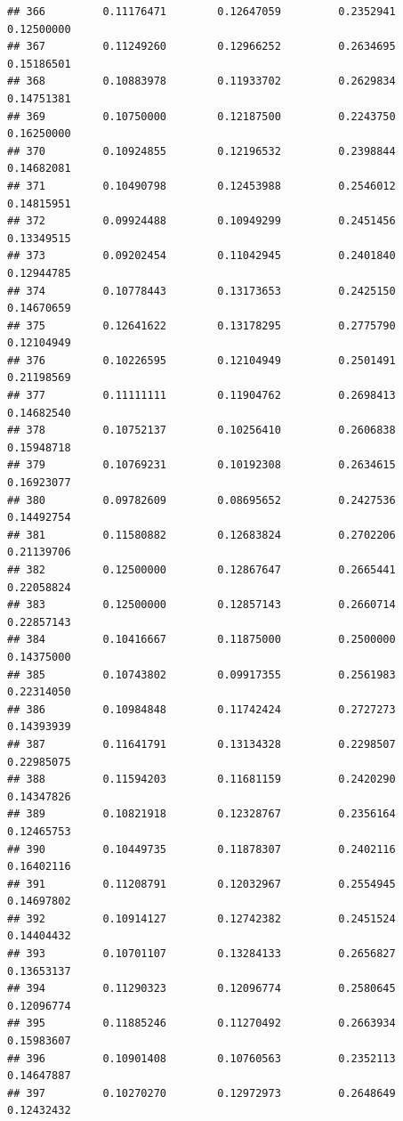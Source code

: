 \documentclass[]{article}
\begin{document}
\begin{verbatim}
## 366         0.11176471        0.12647059         0.2352941          0.12500000
## 367         0.11249260        0.12966252         0.2634695          0.15186501
## 368         0.10883978        0.11933702         0.2629834          0.14751381
## 369         0.10750000        0.12187500         0.2243750          0.16250000
## 370         0.10924855        0.12196532         0.2398844          0.14682081
## 371         0.10490798        0.12453988         0.2546012          0.14815951
## 372         0.09924488        0.10949299         0.2451456          0.13349515
## 373         0.09202454        0.11042945         0.2401840          0.12944785
## 374         0.10778443        0.13173653         0.2425150          0.14670659
## 375         0.12641622        0.13178295         0.2775790          0.12104949
## 376         0.10226595        0.12104949         0.2501491          0.21198569
## 377         0.11111111        0.11904762         0.2698413          0.14682540
## 378         0.10752137        0.10256410         0.2606838          0.15948718
## 379         0.10769231        0.10192308         0.2634615          0.16923077
## 380         0.09782609        0.08695652         0.2427536          0.14492754
## 381         0.11580882        0.12683824         0.2702206          0.21139706
## 382         0.12500000        0.12867647         0.2665441          0.22058824
## 383         0.12500000        0.12857143         0.2660714          0.22857143
## 384         0.10416667        0.11875000         0.2500000          0.14375000
## 385         0.10743802        0.09917355         0.2561983          0.22314050
## 386         0.10984848        0.11742424         0.2727273          0.14393939
## 387         0.11641791        0.13134328         0.2298507          0.22985075
## 388         0.11594203        0.11681159         0.2420290          0.14347826
## 389         0.10821918        0.12328767         0.2356164          0.12465753
## 390         0.10449735        0.11878307         0.2402116          0.16402116
## 391         0.11208791        0.12032967         0.2554945          0.14697802
## 392         0.10914127        0.12742382         0.2451524          0.14404432
## 393         0.10701107        0.13284133         0.2656827          0.13653137
## 394         0.11290323        0.12096774         0.2580645          0.12096774
## 395         0.11885246        0.11270492         0.2663934          0.15983607
## 396         0.10901408        0.10760563         0.2352113          0.14647887
## 397         0.10270270        0.12972973         0.2648649          0.12432432

\end{verbatim}
\end{document}
